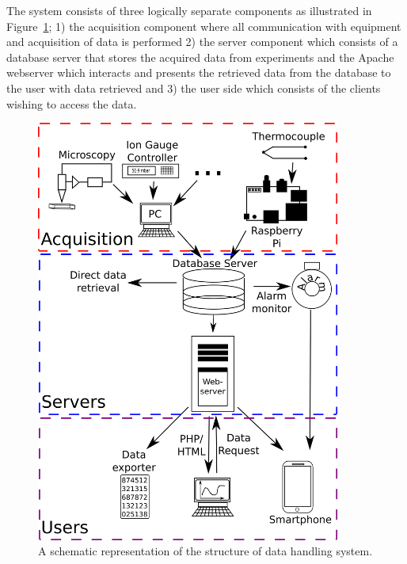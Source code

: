 The system consists of three logically separate components as illustrated in
Figure~\ref{fig:system_overview}; 1) the acquisition component where all
communication with equipment and acquisition of data is performed 2) the server
component which consists of a database server that stores the acquired data from
experiments and the Apache webserver which interacts and presents the retrieved
data from the database to the user with data retrieved and 3) the user side
which consists of the clients wishing to access the data.

\begin{figure}
 \begin{center}
 \includegraphics[width=10cm]{system_overview.png}
 \caption{
   A schematic representation of the structure of data handling system.
   \label{fig:system_overview}
 } 
 \end{center}
\end{figure}

